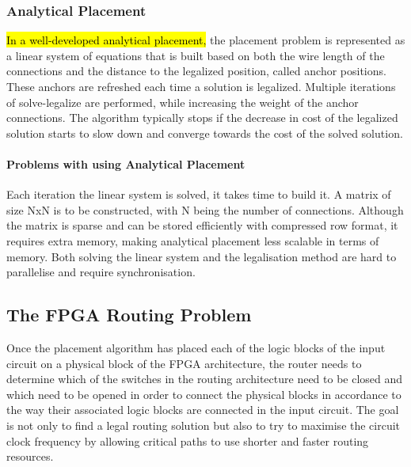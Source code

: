 \documentclass[a4paper,oneside,12pt]{article}
\begin{document}
\subsubsection{Analytical Placement}
\hl{In a well-developed analytical placement,} the placement problem is represented as a linear system of equations that is built based on both the wire length of the connections and the distance to the legalized position, called anchor positions. These anchors are refreshed each time a solution is legalized.
Multiple iterations of solve-legalize are performed, while increasing the weight of the anchor connections. The algorithm typically stops if the decrease in cost of the legalized solution starts to slow down and converge towards the cost of the solved solution.  %

\paragraph{Problems with using Analytical Placement}
Each iteration the linear system is solved, it takes time to build it. A matrix of size NxN is to be constructed, with N being the number of connections. Although the matrix is sparse and can be stored efficiently with compressed row format, it requires extra memory, making analytical placement less scalable in terms of memory.
Both solving the linear system and the legalisation method are hard to parallelise and require synchronisation.

\subsection{The FPGA Routing Problem}
Once the placement algorithm has placed each of the logic blocks of the input circuit on a physical block of the FPGA architecture, the router needs to determine which of the switches in the routing architecture need to be closed and which need to be opened in order to connect the physical blocks in accordance to the way their associated logic blocks are connected in the input circuit. The goal is not only to find a legal routing solution but also to try to maximise the circuit clock frequency by allowing critical paths to use shorter and faster routing resources.
\end{document}
